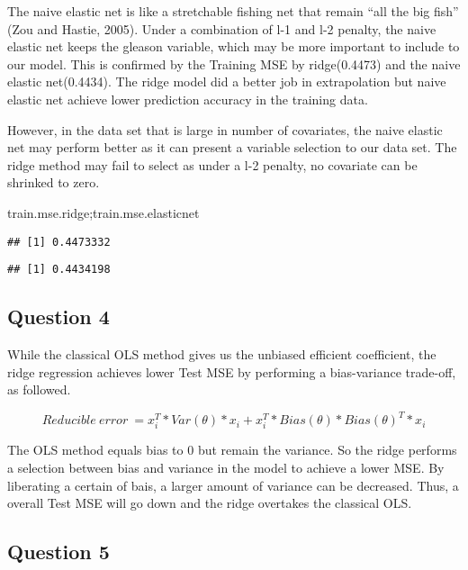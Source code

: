 \documentclass[
]{article}
\newenvironment{Shaded}{\begin{snugshade}}{\end{snugshade}}
\newcommand{\NormalTok}[1]{#1}
\begin{document}
The naive elastic net is like a stretchable fishing net that remain
``all the big fish'' (Zou and Hastie, 2005). Under a combination of l-1
and l-2 penalty, the naive elastic net keeps the gleason variable, which
may be more important to include to our model. This is confirmed by the
Training MSE by ridge(0.4473) and the naive elastic net(0.4434). The
ridge model did a better job in extrapolation but naive elastic net
achieve lower prediction accuracy in the training data.

However, in the data set that is large in number of covariates, the
naive elastic net may perform better as it can present a variable
selection to our data set. The ridge method may fail to select as under
a l-2 penalty, no covariate can be shrinked to zero.

\begin{Shaded}
\begin{Highlighting}[]
\NormalTok{train.mse.ridge;train.mse.elasticnet}
\end{Highlighting}
\end{Shaded}

\begin{verbatim}
## [1] 0.4473332
\end{verbatim}

\begin{verbatim}
## [1] 0.4434198
\end{verbatim}

\hypertarget{question-4}{%
\subsection{Question 4}\label{question-4}}

While the classical OLS method gives us the unbiased efficient
coefficient, the ridge regression achieves lower Test MSE by performing
a bias-variance trade-off, as followed.

\[
Reducible\ error\ = x_i^T*Var(\theta)*x_i+x_i^T*Bias(\theta)*Bias(\theta)^T*x_i
\]

The OLS method equals bias to 0 but remain the variance. So the ridge
performs a selection between bias and variance in the model to achieve a
lower MSE. By liberating a certain of bais, a larger amount of variance
can be decreased. Thus, a overall Test MSE will go down and the ridge
overtakes the classical OLS.

\hypertarget{question-5}{%
\subsection{Question 5}\label{question-5}}
\end{document}
